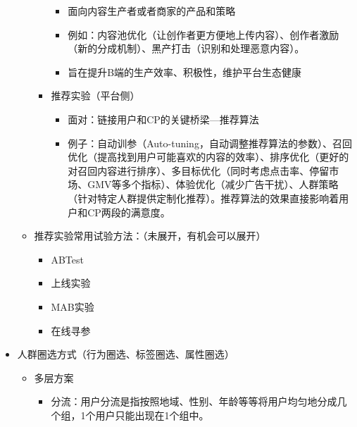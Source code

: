 \documentclass[
  letterpaper,
  DIV=11,
  numbers=noendperiod]{scrreprt}
\begin{document}
\begin{itemize}
\begin{itemize}
\begin{itemize}
      \begin{itemize}
      \item
        面向内容生产者或者商家的产品和策略
      \item
        例如：内容池优化（让创作者更方便地上传内容）、创作者激励（新的分成机制）、黑产打击（识别和处理恶意内容）。
      \item
        旨在提升B端的生产效率、积极性，维护平台生态健康
      \end{itemize}
    \item
      推荐实验（平台侧）

      \begin{itemize}
      \item
        面对：链接用户和CP的关键桥梁---推荐算法
      \item
        例子：自动训参（Auto-tuning，自动调整推荐算法的参数）、召回优化（提高找到用户可能喜欢的内容的效率）、排序优化（更好的对召回内容进行排序）、多目标优化（同时考虑点击率、停留市场、GMV等多个指标）、体验优化（减少广告干扰）、人群策略（针对特定人群提供定制化推荐）。推荐算法的效果直接影响着用户和CP两段的满意度。
      \end{itemize}
    \end{itemize}
  \item
    推荐实验常用试验方法：（未展开，有机会可以展开）

    \begin{itemize}
    \item
      ABTest
    \item
      上线实验
    \item
      MAB实验
    \item
      在线寻参
    \end{itemize}
  \end{itemize}
\item
  人群圈选方式（行为圈选、标签圈选、属性圈选）

  \begin{itemize}
  \item
    多层方案

    \begin{itemize}
    \item
      分流：用户分流是指按照地域、性别、年龄等等将用户均匀地分成几个组，1个用户只能出现在1个组中。


\end{itemize}
\end{itemize}
\end{itemize}
\end{document}
